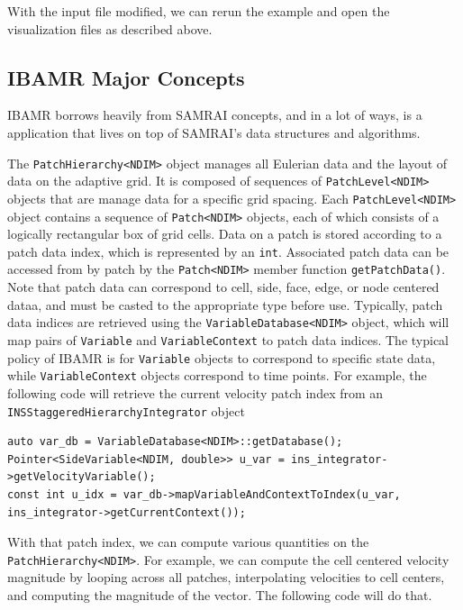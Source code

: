 \documentclass{article}
\begin{document}
With the input file modified, we can rerun the example and open the visualization files as described above.

\subsection{IBAMR Major Concepts}
IBAMR borrows heavily from SAMRAI concepts, and in a lot of ways, is a application that lives on top of SAMRAI's data structures and algorithms.

The \verb|PatchHierarchy<NDIM>| object manages all Eulerian data and the layout of data on the adaptive grid. It is composed of sequences of \verb|PatchLevel<NDIM>| objects that are manage data for a specific grid spacing. Each \verb|PatchLevel<NDIM>| object contains a sequence of \verb|Patch<NDIM>| objects, each of which consists of a logically rectangular box of grid cells. Data on a patch is stored according to a patch data index, which is represented by an \verb|int|. Associated patch data can be accessed from by patch by the \verb|Patch<NDIM>| member function \verb|getPatchData()|. Note that patch data can correspond to cell, side, face, edge, or node centered dataa, and must be casted to the appropriate type before use. Typically, patch data indices are retrieved using the \verb|VariableDatabase<NDIM>| object, which will map pairs of \verb|Variable| and \verb|VariableContext| to patch data indices. The typical policy of IBAMR is for \verb|Variable| objects to correspond to specific state data, while \verb|VariableContext| objects correspond to time points. For example, the following code will retrieve the current velocity patch index from an \verb|INSStaggeredHierarchyIntegrator| object
\begin{verbatim}
auto var_db = VariableDatabase<NDIM>::getDatabase();
Pointer<SideVariable<NDIM, double>> u_var = ins_integrator->getVelocityVariable();
const int u_idx = var_db->mapVariableAndContextToIndex(u_var, ins_integrator->getCurrentContext());
\end{verbatim}
With that patch index, we can compute various quantities on the \verb|PatchHierarchy<NDIM>|. For example, we can compute the cell centered velocity magnitude by looping across all patches, interpolating velocities to cell centers, and computing the magnitude of the vector. The following code will do that.
\end{document}
